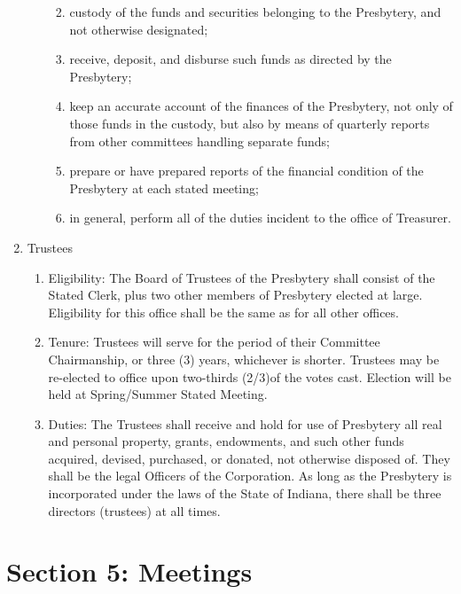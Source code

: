\documentclass[
]{book}
\providecommand{\tightlist}{%
  \setlength{\itemsep}{0pt}\setlength{\parskip}{0pt}}
\begin{document}
\begin{enumerate}
\begin{enumerate}
    \begin{enumerate}
    \def\labelenumiii{\alph{enumiii}.}
    \tightlist
    \item
      custody of the funds and securities belonging to the Presbytery, and not otherwise designated;
    \item
      receive, deposit, and disburse such funds as directed by the Presbytery;
    \item
      keep an accurate account of the finances of the Presbytery, not only of those funds in the custody, but also by means of quarterly reports from other committees handling separate funds;
    \item
      prepare or have prepared reports of the financial condition of the Presbytery at each stated meeting;
    \item
      in general, perform all of the duties incident to the office of Treasurer.
    \end{enumerate}
  \end{enumerate}
\item
  Trustees

  \begin{enumerate}
  \def\labelenumii{\arabic{enumii}.}
  \tightlist
  \item
    Eligibility: The Board of Trustees of the Presbytery shall consist of the Stated Clerk, plus two other members of Presbytery elected at large. Eligibility for this office shall be the same as for all other offices.
  \item
    Tenure: Trustees will serve for the period of their Committee Chairmanship, or three (3) years, whichever is shorter. Trustees may be re-elected to office upon two-thirds (2/3)of the votes cast. Election will be held at Spring/Summer Stated Meeting.
  \item
    Duties: The Trustees shall receive and hold for use of Presbytery all real and personal property, grants, endowments, and such other funds acquired, devised, purchased, or donated, not otherwise disposed of. They shall be the legal Officers of the Corporation. As long as the Presbytery is incorporated under the laws of the State of Indiana, there shall be three directors (trustees) at all times.
  \end{enumerate}
\end{enumerate}

\hypertarget{section-5-meetings}{%
\section{Section 5: Meetings}\label{section-5-meetings}}
\end{document}
